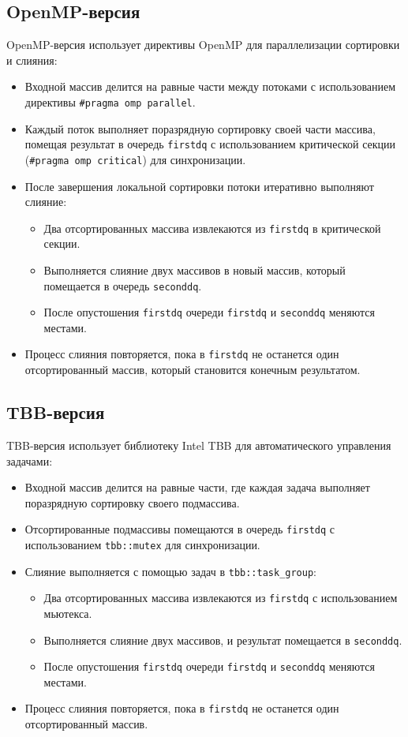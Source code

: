 \documentclass[a4paper,12pt]{article}
\begin{document}
\subsection{OpenMP-версия}
OpenMP-версия использует директивы OpenMP для параллелизации сортировки и слияния:
\begin{itemize}
    \item Входной массив делится на равные части между потоками с использованием директивы \texttt{\#pragma omp parallel}.
    \item Каждый поток выполняет поразрядную сортировку своей части массива, помещая результат в очередь \texttt{firstdq} с использованием критической секции (\texttt{\#pragma omp critical}) для синхронизации.
    \item После завершения локальной сортировки потоки итеративно выполняют слияние:
        \begin{itemize}
            \item Два отсортированных массива извлекаются из \texttt{firstdq} в критической секции.
            \item Выполняется слияние двух массивов в новый массив, который помещается в очередь \texttt{seconddq}.
            \item После опустошения \texttt{firstdq} очереди \texttt{firstdq} и \texttt{seconddq} меняются местами.
        \end{itemize}
    \item Процесс слияния повторяется, пока в \texttt{firstdq} не останется один отсортированный массив, который становится конечным результатом.
\end{itemize}

\subsection{TBB-версия}
TBB-версия использует библиотеку Intel TBB для автоматического управления задачами:
\begin{itemize}
    \item Входной массив делится на равные части, где каждая задача выполняет поразрядную сортировку своего подмассива.
    \item Отсортированные подмассивы помещаются в очередь \texttt{firstdq} с использованием \texttt{tbb::mutex} для синхронизации.
    \item Слияние выполняется с помощью задач в \texttt{tbb::task\_group}:
        \begin{itemize}
            \item Два отсортированных массива извлекаются из \texttt{firstdq} с использованием мьютекса.
            \item Выполняется слияние двух массивов, и результат помещается в \texttt{seconddq}.
            \item После опустошения \texttt{firstdq} очереди \texttt{firstdq} и \texttt{seconddq} меняются местами.
        \end{itemize}
    \item Процесс слияния повторяется, пока в \texttt{firstdq} не останется один отсортированный массив.
\end{itemize}
\end{document}
